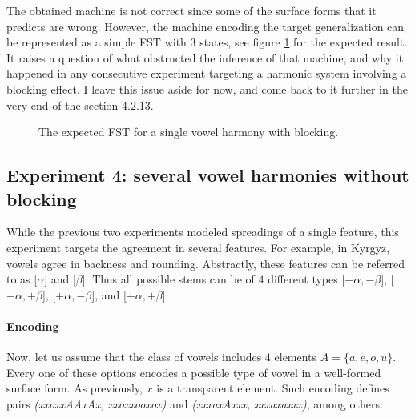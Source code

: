 The obtained machine is not correct since some of the surface forms that it predicts are wrong.
However, the machine encoding the target generalization can be represented as a simple FST with $3$ states, see figure \ref{exp2fstrr} for the expected result.
It raises a question of what obstructed the inference of that machine, and why it happened in any consecutive experiment targeting a harmonic system involving a blocking effect.
I leave this issue aside for now, and come back to it further in the very end of the section 4.2.13.

\begin{figure}[h!] 
\centering
{}
\caption{The expected FST for a single vowel harmony with blocking.}
\label{exp2fstrr}
\end{figure}



\subsection{Experiment 4: several vowel harmonies without blocking}

While the previous two experiments modeled spreadings of a single feature, this experiment targets the agreement in several features.
For example, in Kyrgyz, vowels agree in backness and rounding.
Abstractly, these features can be referred to as [$\alpha$] and [$\beta$].
Thus all possible stems can be of $4$ different types [$-\alpha, -\beta$], [$-\alpha, +\beta$], [$+\alpha, -\beta$], and [$+\alpha, +\beta$].


\paragraph{Encoding}

Now, let us assume that the class of vowels includes $4$ elements $A = \{a, e, o, u\}$.
Every one of these options encodes a possible type of vowel in a well-formed surface form.
As previously, $x$ is a transparent element.
Such encoding defines pairs \emph{(xxoxxAAxAx, xxoxxooxox)} and \emph{(xxxaxAxxx, xxxaxaxxx)}, among others.





